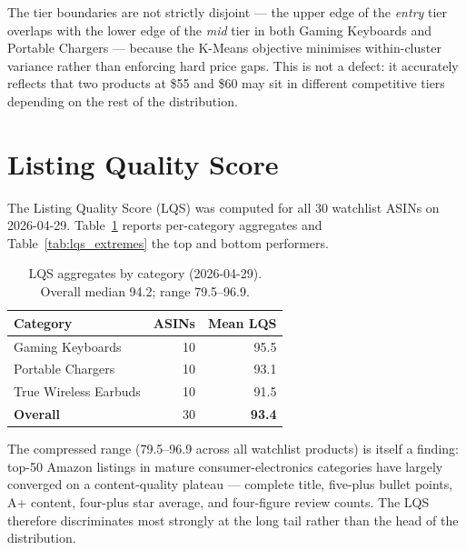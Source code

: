 The tier boundaries are not strictly disjoint --- the upper edge of the
\textit{entry} tier overlaps with the lower edge of the \textit{mid} tier in
both Gaming Keyboards and Portable Chargers --- because the K-Means objective
minimises within-cluster variance rather than enforcing hard price gaps.
This is not a defect: it accurately reflects that two products at \$55 and
\$60 may sit in different competitive tiers depending on the rest of the
distribution.

\section{Listing Quality Score}

The Listing Quality Score (LQS) was computed for all 30 watchlist ASINs on
2026-04-29. Table~\ref{tab:lqs_summary} reports per-category aggregates and
Table~\ref{tab:lqs_extremes} the top and bottom performers.

\begin{table}[H]
  \centering
  \begin{tabular}{lrr}
    \toprule
    \textbf{Category} & \textbf{ASINs} & \textbf{Mean LQS} \\
    \midrule
    Gaming Keyboards      & 10 & 95.5 \\
    Portable Chargers     & 10 & 93.1 \\
    True Wireless Earbuds & 10 & 91.5 \\
    \midrule
    \textbf{Overall}      & 30 & \textbf{93.4} \\
    \bottomrule
  \end{tabular}
  \caption{LQS aggregates by category (2026-04-29).
  Overall median 94.2; range 79.5--96.9.}
  \label{tab:lqs_summary}
\end{table}

The compressed range (79.5--96.9 across all watchlist products) is itself a
finding: top-50 Amazon listings in mature consumer-electronics categories
have largely converged on a content-quality plateau --- complete title,
five-plus bullet points, A+ content, four-plus star average, and four-figure
review counts. The LQS therefore discriminates most strongly at the long
tail rather than the head of the distribution.

